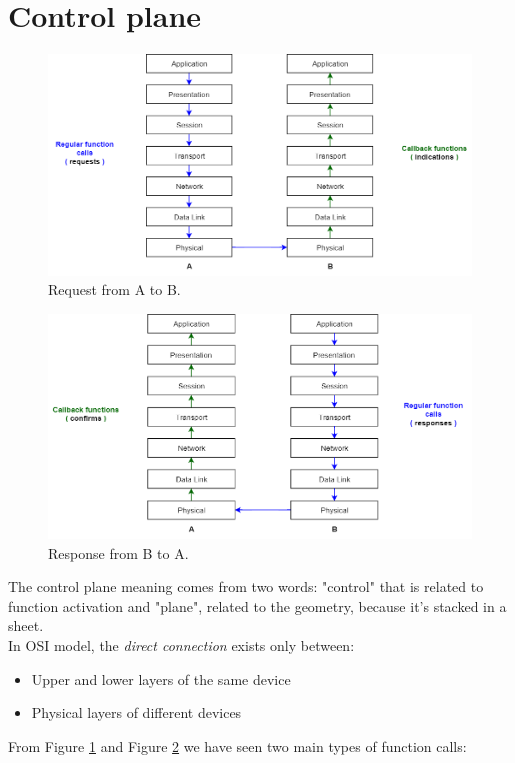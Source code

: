 \section{Control plane}
\begin{figure}[h]
\centering
\includegraphics[scale=0.4]{Images/OSI/request_AB}
\caption{\footnotesize{Request from A to B.}}\label{requestAB}
\end{figure}
\begin{figure}[h]
\centering
\includegraphics[scale=0.4]{Images/OSI/response_BA}
\caption{\footnotesize{Response from B to A.}}\label{responseBA}
\end{figure}
The control plane meaning comes from two words: "control" that is related to function activation and "plane", related to the geometry, because it's stacked in a sheet.\\
In OSI model, the \textit{direct connection} exists only between:
\begin{itemize}
\item{Upper and lower layers of the same device}
\item{Physical layers of different devices}
\end{itemize} 
From Figure \ref{requestAB} and Figure \ref{responseBA} we have seen two main types of function calls:
